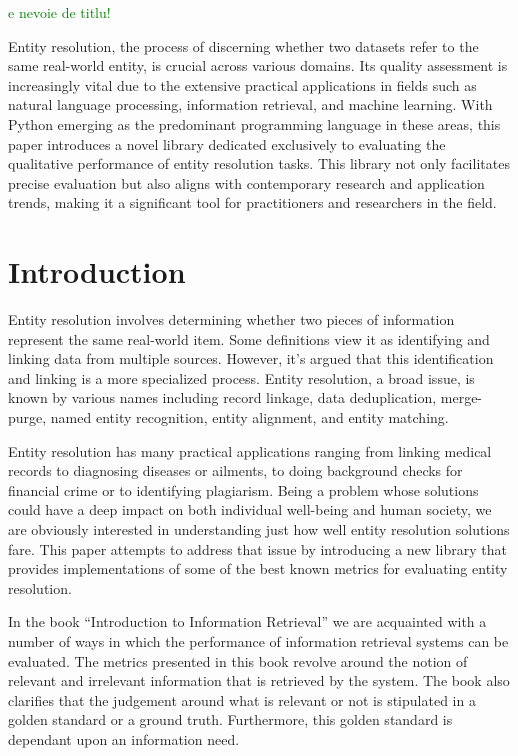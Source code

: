 \documentclass[11pt]{article}
\begin{document}
    \theoremstyle{definition}
    \newtheorem{defn}{Definition}[section]
    
    \textcolor{green}{e nevoie de titlu!}
    
    \abstract\label{abstract}

    Entity resolution, the process of discerning whether two datasets refer to
    the same real-world entity, is crucial across various domains.
    Its quality assessment is increasingly vital due to the extensive practical
    applications in fields such as natural language processing, information
    retrieval, and machine learning.
    With Python emerging as the predominant programming language in these areas,
    this paper introduces a novel library dedicated exclusively to evaluating
    the qualitative performance of entity resolution tasks.
    This library not only facilitates precise evaluation but also aligns with
    contemporary research and application trends, making it a significant tool
    for practitioners and researchers in the field.


    \section{Introduction}\label{sec:introduction}
    Entity resolution involves determining whether two pieces of information
    represent the same real-world item.
    Some definitions view it as identifying and linking data from multiple
    sources\cite{Qia17}.
    However, it's argued that this identification and linking is a more
    specialized process\cite{Tal11}.
    Entity resolution, a broad issue, is known by various names including record
    linkage, data deduplication, merge-purge, named entity recognition, entity
    alignment, and entity matching.

    Entity resolution has many practical applications ranging from linking
    medical records to diagnosing diseases or ailments, to doing background
    checks for financial crime or to identifying plagiarism.
    Being a problem whose solutions could have a deep impact on both individual
    well-being and human society, we are obviously interested in understanding
    just how well entity resolution solutions fare.
    This paper attempts to address that issue by introducing a new library that
    provides implementations of some of the best known metrics for evaluating
    entity resolution.

    In the book ``Introduction to Information Retrieval'' we are acquainted with
    a number of ways in which the performance of information retrieval systems
    can be evaluated\cite{manning2008}.
    The metrics presented in this book revolve around the notion of relevant and
    irrelevant information that is retrieved by the system.
    The book also clarifies that the judgement around what is relevant or not is
    stipulated in a golden standard or a ground truth.
    Furthermore, this golden standard is dependant upon an information need.
\end{document}
